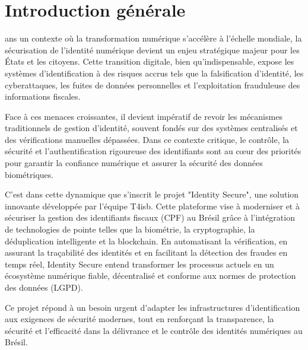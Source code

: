 \chapter*{Introduction générale}
ans un contexte où la transformation numérique s’accélère à l’échelle mondiale, la sécurisation de l’identité numérique devient un enjeu stratégique majeur pour les États et les citoyens. Cette transition digitale, bien qu’indispensable, expose les systèmes d’identification à des risques accrus tels que la falsification d'identité, les cyberattaques, les fuites de données personnelles et l’exploitation frauduleuse des informations fiscales.

Face à ces menaces croissantes, il devient impératif de revoir les mécanismes traditionnels de gestion d’identité, souvent fondés sur des systèmes centralisés et des vérifications manuelles dépassées. Dans ce contexte critique, le contrôle, la sécurité et l’authentification rigoureuse des identifiants sont au cœur des priorités pour garantir la confiance numérique et assurer la sécurité des données biométriques.

C’est dans cette dynamique que s’inscrit le projet "Identity Secure", une solution innovante développée par l’équipe T4isb. Cette plateforme vise à moderniser et à sécuriser la gestion des identifiants fiscaux (CPF)\cite{b42} au Brésil grâce à l’intégration de technologies de pointe telles que la biométrie, la cryptographie\cite{b46}, la déduplication intelligente et la blockchain\cite{b47}. En automatisant la vérification, en assurant la traçabilité des identités et en facilitant la détection des fraudes en temps réel, Identity Secure entend transformer les processus actuels en un écosystème numérique fiable, décentralisé et conforme aux normes de protection des données (LGPD)\cite{b48}.

Ce projet répond à un besoin urgent d’adapter les infrastructures d’identification aux exigences de sécurité modernes, tout en renforçant la transparence, la sécurité et l’efficacité dans la délivrance et le contrôle des identités numériques au Brésil.\\

